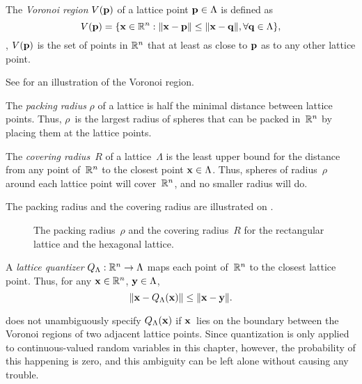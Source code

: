 \begin{subappendices}
  \begin{definition}
    The \emph{Voronoi region} $V(\mathbf{p})$ of a lattice point $\mathbf{p} \in \Lambda$ is
    defined as \begin{equation*} V(\mathbf{p}) = \{\mathbf{x} \in \mathbb{R}^n : \|\mathbf{x} - \mathbf{p}\| \le \|\mathbf{x} -
      \mathbf{q}\|, \forall \mathbf{q} \in \Lambda\}, \end{equation*} \ie, $V(\mathbf{p})$ is the set of
      points in $\mathbb{R}^n$ that at least as close to $\mathbf{p}$ as to any other lattice
      point.
  \end{definition}
  See  for an illustration of the Voronoi region.

  \begin{definition}
    The \emph{packing radius} $\rho$ of a lattice is half the minimal distance
    between lattice points. Thus, $\rho$~is the largest radius of spheres that
    can be packed in~$\mathbb{R}^n$ by placing them at the lattice points.
  \end{definition}

  \begin{definition}
    The \emph{covering radius}~$R$ of a lattice~$\Lambda$ is the least upper
    bound for the distance from any point of~$\mathbb{R}^n$ to the closest point $\mathbf{x} \in
    \Lambda$. Thus, spheres of radius~$\rho$ around each lattice point will
    cover~$\mathbb{R}^n$, and no smaller radius will do.~\cite{ConwayS1988}
  \end{definition}

  The packing radius and the covering radius are illustrated on
  .
  \begin{figure}
    \begin{center}
      
    \end{center}
    \caption{The packing radius~$\rho$ and the covering radius~$R$ for the
    rectangular lattice and the hexagonal lattice.}
    \label{fig:packingcoveringr}
  \end{figure}

  \begin{definition}
    \label{def:latticequant}
    A \emph{lattice quantizer} ${Q_{\Lambda}} : \mathbb{R}^n \rightarrow \Lambda$ maps each point
    of~$\mathbb{R}^n$ to the closest lattice point. Thus, for any $\mathbf{x} \in \mathbb{R}^n$, $\mathbf{y} \in
    \Lambda$,
    \begin{equation*}
      \| \mathbf{x} - {Q_{\Lambda}}(\mathbf{x}) \| \le \|\mathbf{x} - \mathbf{y}\|.
    \end{equation*}
  \end{definition}

  \begin{remark}
    \label{rem:latticequant}
     does not unambiguously specify ${Q_{\Lambda}}(\mathbf{x})$ if $\mathbf{x}$~lies
    on the boundary between the Voronoi regions of two adjacent lattice points.
    Since quantization is only applied to continuous-valued random variables in
    this chapter, however, the probability of this happening is zero, and this
    ambiguity can be left alone without causing any trouble.
  \end{remark}


\end{subappendices}
